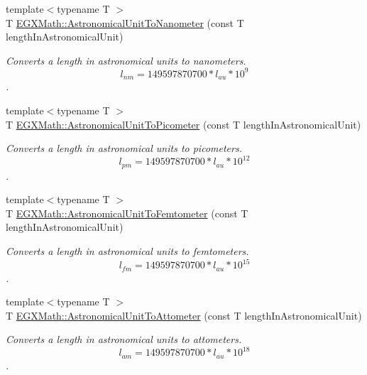 \begin{DoxyCompactItemize}
{\footnotesize template$<$typename T $>$ }\\T \mbox{\hyperlink{group___e_g_x_math-_conversions-_length_conversions-_astronomical-_astronomical_unit-_s_i_ga96544de7ba57c47bcdf515f2603d0460}{E\+G\+X\+Math\+::\+Astronomical\+Unit\+To\+Nanometer}} (const T length\+In\+Astronomical\+Unit)
\begin{DoxyCompactList}\small\item\em Converts a length in astronomical units to nanometers. \[ l_{nm}=149597870700 * l_{au} * 10^{9} \]. \end{DoxyCompactList}\item 
{\footnotesize template$<$typename T $>$ }\\T \mbox{\hyperlink{group___e_g_x_math-_conversions-_length_conversions-_astronomical-_astronomical_unit-_s_i_gaf512b8f1ace4be83fbeb252b447405d6}{E\+G\+X\+Math\+::\+Astronomical\+Unit\+To\+Picometer}} (const T length\+In\+Astronomical\+Unit)
\begin{DoxyCompactList}\small\item\em Converts a length in astronomical units to picometers. \[ l_{pm}=149597870700 * l_{au} * 10^{12} \]. \end{DoxyCompactList}\item 
{\footnotesize template$<$typename T $>$ }\\T \mbox{\hyperlink{group___e_g_x_math-_conversions-_length_conversions-_astronomical-_astronomical_unit-_s_i_gaa39df97fbf96f7e68369e60f34351234}{E\+G\+X\+Math\+::\+Astronomical\+Unit\+To\+Femtometer}} (const T length\+In\+Astronomical\+Unit)
\begin{DoxyCompactList}\small\item\em Converts a length in astronomical units to femtometers. \[ l_{fm}=149597870700 * l_{au} * 10^{15} \]. \end{DoxyCompactList}\item 
{\footnotesize template$<$typename T $>$ }\\T \mbox{\hyperlink{group___e_g_x_math-_conversions-_length_conversions-_astronomical-_astronomical_unit-_s_i_ga6a7dd29c7c91e4ec30e4bb2fe7110210}{E\+G\+X\+Math\+::\+Astronomical\+Unit\+To\+Attometer}} (const T length\+In\+Astronomical\+Unit)
\begin{DoxyCompactList}\small\item\em Converts a length in astronomical units to attometers. \[ l_{am}=149597870700 * l_{au} * 10^{18} \]. \end{DoxyCompactList}\item 

\end{DoxyCompactItemize}
